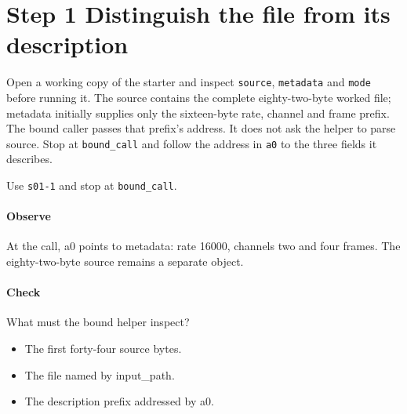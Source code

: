 \section{Step 1 Distinguish the file from its description}\label{pcm-wav-s01}
Open a working copy of the starter and inspect \texttt{source}, \texttt{metadata} and \texttt{mode} before running it. The source contains the complete eighty-two-byte worked file; metadata initially supplies only the sixteen-byte rate, channel and frame prefix. The bound caller passes that prefix's address. It does not ask the helper to parse source. Stop at \texttt{bound\_call} and follow the address in \texttt{a0} to the three fields it describes.

Use \texttt{s01-1} and stop at \texttt{bound\_call}.

\paragraph{Observe} At the call, a0 points to metadata: rate 16000, channels two and four frames. The eighty-two-byte source remains a separate object.

\paragraph{Check} What must the bound helper inspect?
\begin{itemize}
  \item[A.] The first forty-four source bytes.
  \item[B.] The file named by input\_path.
  \item[C.] The description prefix addressed by a0.
\end{itemize}
